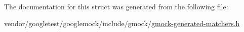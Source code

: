 The documentation for this struct was generated from the following file\+:\begin{DoxyCompactItemize}
\item 
vendor/googletest/googlemock/include/gmock/\hyperlink{gmock-generated-matchers_8h}{gmock-\/generated-\/matchers.\+h}\end{DoxyCompactItemize}
